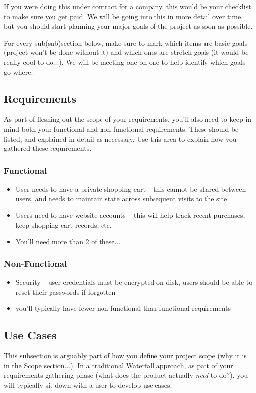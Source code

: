 \documentclass[10pt,conference,onecolumn,compsoc]{IEEEtran}
\begin{document}
If you were doing this under contract for a company, this would be your checklist to make sure you get paid.  We will be going into this in more detail over time, but you should start planning your major goals of the project as soon as possible.

For every sub(sub)section below, make sure to mark which items are basic goals (project won't be done without it) and which ones are stretch goals (it would be really cool to do...).  We will be meeting one-on-one to help identify which goals go where.

\subsection{Requirements}
As part of fleshing out the scope of your requirements, you'll also need to keep in mind both your functional and non-functional requirements.  These should be listed, and explained in detail as necessary.  Use this area to explain how you gathered these requirements.

\subsubsection{Functional}
\begin{itemize}
\item User needs to have a private shopping cart -- this cannot be shared between users, and needs to maintain state across subsequent visits to the site
\item Users need to have website accounts -- this will help track recent purchases, keep shopping cart records, etc.
\item You'll need more than 2 of these...
\end{itemize}

\subsubsection{Non-Functional}
\begin{itemize}
\item Security -- user credentials must be encrypted on disk, users should be able to reset their passwords if forgotten
\item you'll typically have fewer non-functional than functional requirements
\end{itemize}

\subsection{Use Cases}
This subsection is arguably part of how you define your project scope (why it is in the Scope section...).  In a traditional Waterfall approach, as part of your requirements gathering phase (what does the product actually \emph{need} to do?), you will typically sit down with a user to develop use cases.
\end{document}
